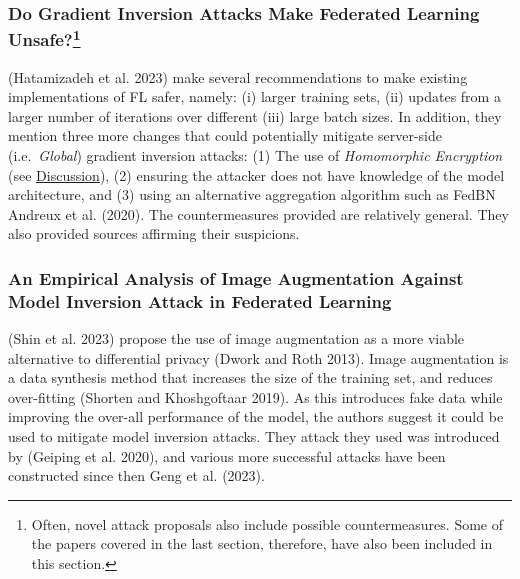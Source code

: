 \hypertarget{do-gradient-inversion-attacks-make-federated-learning-unsafe1}{%
\subsubsection[Do Gradient Inversion Attacks Make Federated Learning
Unsafe?]{\texorpdfstring{Do Gradient Inversion Attacks Make Federated
Learning
Unsafe?\footnote{Often, novel attack proposals also include possible
  countermeasures. Some of the papers covered in the last section,
  therefore, have also been included in this section.}}{Do Gradient Inversion Attacks Make Federated Learning Unsafe?}}\label{do-gradient-inversion-attacks-make-federated-learning-unsafe1}}

(Hatamizadeh et al. 2023) make several recommendations to make existing
implementations of FL safer, namely: (i) larger training sets, (ii)
updates from a larger number of iterations over different (iii) large
batch sizes. In addition, they mention three more changes that could
potentially mitigate server-side (i.e.~\emph{Global}) gradient inversion
attacks: (1) The use of \emph{Homomorphic Encryption} (see
\protect\hyperlink{discussion}{Discussion}), (2) ensuring the attacker
does not have knowledge of the model architecture, and (3) using an
alternative aggregation algorithm such as FedBN Andreux et al. (2020).
The countermeasures provided are relatively general. They also provided
sources affirming their suspicions.

\hypertarget{an-empirical-analysis-of-image-augmentation-against-model-inversion-attack-in-federated-learning}{%
\subsubsection{An Empirical Analysis of Image Augmentation Against Model
Inversion Attack in Federated
Learning}\label{an-empirical-analysis-of-image-augmentation-against-model-inversion-attack-in-federated-learning}}

(Shin et al. 2023) propose the use of image augmentation as a more
viable alternative to differential privacy (Dwork and Roth 2013). Image
augmentation is a data synthesis method that increases the size of the
training set, and reduces over-fitting (Shorten and Khoshgoftaar 2019).
As this introduces fake data while improving the over-all performance of
the model, the authors suggest it could be used to mitigate model
inversion attacks. They attack they used was introduced by (Geiping et
al. 2020), and various more successful attacks have been constructed
since then Geng et al. (2023).

